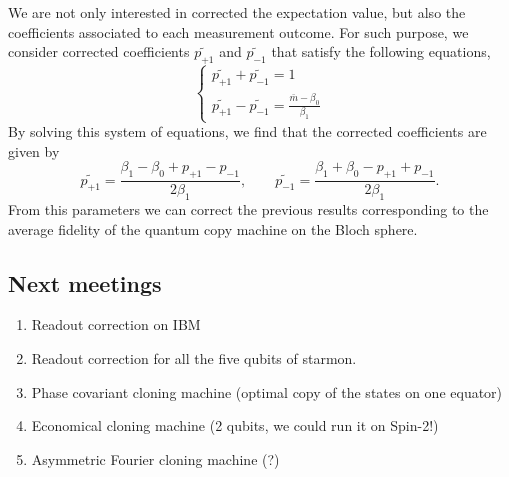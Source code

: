 \documentclass[11pt]{article}
\begin{document}
We are not only interested in corrected the expectation value, but also the coefficients associated to each measurement outcome. For such purpose, we consider corrected coefficients $\tilde{p_{+1}}$ and $\tilde{p_{-1}}$ that satisfy the following equations,
\begin{equation}
\left\{ \begin{array}{c}
\tilde{p_{+1}} + \tilde{p_{-1}} = 1\\
\tilde{p_{+1}} - \tilde{p_{-1}} = \frac{\bar{m}-\beta_0}{\beta_1}
\end{array} \right.
\end{equation}
By solving this system of equations, we find that the corrected coefficients are given by
\begin{equation}
\tilde{p_{+1}} = \frac{\beta_1-\beta_0+p_{+1}-p_{-1}}{2\beta_1},\qquad \tilde{p_{-1}} = \frac{\beta_1+\beta_0-p_{+1}+p_{-1}}{2\beta_1}.
\end{equation} 
From this parameters we can correct the previous results corresponding to the average fidelity of the quantum copy machine on the Bloch sphere. 
\subsection{Next meetings}
\begin{enumerate}
    \item Readout correction on IBM
    \item Readout correction for all the five qubits of starmon.
    \item Phase covariant cloning machine (optimal copy of the states on one equator)
    \item Economical cloning machine (2 qubits, we could run it on Spin-2!)
    \item Asymmetric Fourier cloning machine (?)
\end{enumerate}
\end{document}
